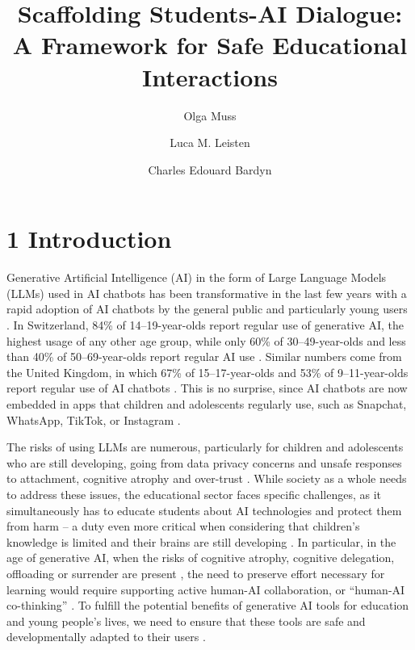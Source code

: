 \documentclass[fleqn,10pt]{wlscirep}
\title{Scaffolding Students-AI Dialogue: A Framework for Safe Educational Interactions}
\author[1,2,+,*]{Olga Muss}
\author[2,+,X]{Luca M. Leisten}
\author[3]{Charles Edouard Bardyn}
\affil[1]{Université de Neuchâtel, Switzerland}
\affil[2]{ETH Zurich, Switzerland}
\affil[3]{AI Swiss, Switzerland}
\affil[*]{olga.muss@unine.ch}
\affil[X]{lleisten@ethz.ch}
\affil[+]{these authors contributed equally to this work}
\begin{document}
\flushbottom
\maketitle
\thispagestyle{empty}

\section*{1 Introduction}

Generative Artificial Intelligence (AI) in the form of Large Language Models (LLMs) used in AI chatbots has been transformative in the last few years with a rapid adoption of AI chatbots by the general public and particularly young users \cite{InternetMatters2025, CommonSense2025, Hashem2025, Microsoft2024}. In Switzerland, 84\% of 14--19-year-olds report regular use of generative AI, the highest usage of any other age group, while only 60\% of 30--49-year-olds and less than 40\% of 50--69-year-olds report regular AI use \cite{WIP-CH2025}. Similar numbers come from the United Kingdom, in which 67\% of 15--17-year-olds and 53\% of 9--11-year-olds report regular use of AI chatbots \cite{InternetMatters2025}. This is no surprise, since AI chatbots are now embedded in apps that children and adolescents regularly use, such as Snapchat, WhatsApp, TikTok, or Instagram \cite{Ofcom2025, Vosloo2025}.

The risks of using LLMs are numerous, particularly for children and adolescents who are still developing, going from data privacy concerns and unsafe responses to attachment, cognitive atrophy and over-trust \cite{Neugnot2024, Kurian2025, UNESCO2021, VIOLA2017, Yu2025}. While society as a whole needs to address these issues, the educational sector faces specific challenges, as it simultaneously has to educate students about AI technologies and protect them from harm \cite{UNCRC1989} -- a duty even more critical when considering that children's knowledge is limited and their brains are still developing \cite{Gogtay2004}. In particular, in the age of generative AI, when the risks of cognitive atrophy, cognitive delegation, offloading or surrender are present \cite{Shaw2026}, the need to preserve effort necessary for learning would require supporting active human-AI collaboration, or ``human-AI co-thinking'' \cite{BardynForthcoming}. To fulfill the potential benefits of generative AI tools for education and young people's lives, we need to ensure that these tools are safe and developmentally adapted to their users \cite{UNESCO2021}.
\end{document}
